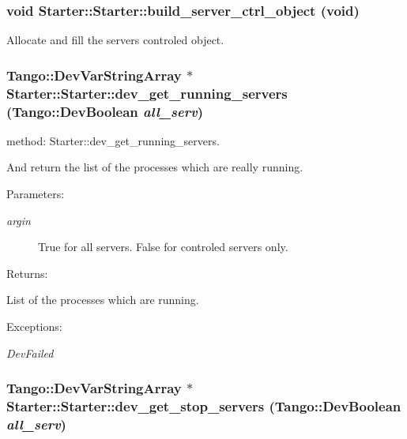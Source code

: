 \subsubsection{\setlength{\rightskip}{0pt plus 5cm}void Starter::Starter::build\_\-server\_\-ctrl\_\-object (void)\hspace{0.3cm}{\tt  [protected]}}\label{classStarter_1_1Starter_z6_2}


Allocate and fill the servers controled object.

\subsubsection{\setlength{\rightskip}{0pt plus 5cm}Tango::Dev\-Var\-String\-Array $\ast$ Starter::Starter::dev\_\-get\_\-running\_\-servers (Tango::Dev\-Boolean {\em all\_\-serv})}\label{classStarter_1_1Starter_z5_3}


method: Starter::dev\_\-get\_\-running\_\-servers.

And return the list of the processes which are really running. \begin{Desc}
\item[Parameters: ]\par
\begin{description}
\item[{\em 
argin}]True for all servers. False for controled servers only. \end{description}
\end{Desc}
\begin{Desc}
\item[Returns: ]\par
List of the processes which are running. \end{Desc}
\begin{Desc}
\item[Exceptions: ]\par
\begin{description}
\item[{\em 
Dev\-Failed}] \end{description}
\end{Desc}
\subsubsection{\setlength{\rightskip}{0pt plus 5cm}Tango::Dev\-Var\-String\-Array $\ast$ Starter::Starter::dev\_\-get\_\-stop\_\-servers (Tango::Dev\-Boolean {\em all\_\-serv})}\label{classStarter_1_1Starter_z5_4}


